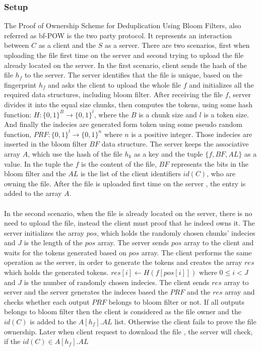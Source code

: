 \documentclass[12pt]{article}
\begin{document}
\subsubsection{Setup}
\label{subsub:setup6}
The Proof of Ownership Scheme for Deduplication Using Bloom Filters, also referred as bf-POW is the two party protocol. It represents an interaction between $C$ as a client and the $S$ as a server. There are two scenarios, first when uploading the file first time on the server and second trying to upload the file already located on the server. In the first scenario, client  sends the hash of the file  $h_f$  to the server. The server identifies that the file is unique, based on the fingerprint $h_f$ and asks the client to upload the whole file $f$ and initializes all the required data structures, including bloom filter. After receiving the file $f$, server divides it into the equal size chunks, then computes the tokens, using some hash function: $H:\{0,1\}^B\to\{0,1\}^l$, where the $B$ is a chunk size and $l$ is a token size. And finally the indecies are generated form token using some pseudo random function, $PRF: \{0,1\}^l \to \{0,1\}^{n}$ where $n$ is a positive  integer. Those indecies are inserted in the bloom filter $BF$ data structure. The server keeps the associative array $A$, which use the hash of the file $h_k$ as a key and the tuple $\{f,BF,AL\}$ as a value. In the tuple the $f$ is the content of the file, $BF$ represents the bits in the bloom filter and the $AL$ is the list of the client identifiers $id(C)$, who are owning the file. After the file is uploaded first time on the server , the entry is added to the array $A$.\\\\
In the second scenario, when the file is already located on the server, there is no need to upload the file, instead the client must proof that he indeed owns it. The server initializes the array $pos$, which holds the randomly chosen chunks' indecies and $J$ is the length of the $pos$ array. The server sends $pos$ array to the client and waits for the tokens generated based on $pos$ array. The client performs the same operation as the server, in order to generate the tokens and creates the array $res$ which holds the generated tokens.  $res[i]\gets H(f[pos[i]])$ where $ 0 \leq i < J$ and $J$ is the number of randomly chosen indecies. The client sends $res$ array to server and the server generates the indeces based the $PRF$ and the  $res$ array and checks whether each output $PRF$ belongs to bloom filter or not. If all outputs belongs to bloom filter then the client is considered as the file owner and the $id(C)$ is added to the $A[h_f].AL$ list. Otherwise the client fails to prove the file ownership. Later when client request to download the file , the server will check, if the $id(C) \in A[h_f].AL$
\end{document}
